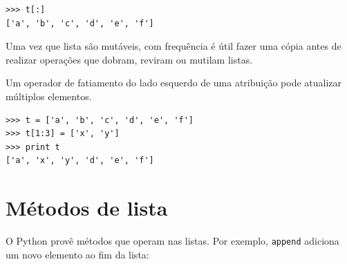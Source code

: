 
\beforeverb
\begin{verbatim}
>>> t[:]
['a', 'b', 'c', 'd', 'e', 'f']
\end{verbatim}
\afterverb
%

Uma vez que lista são mutáveis, com frequência é útil fazer uma cópia
antes de realizar operações que dobram, reviram ou mutilam listas.


Um operador de fatiamento do lado esquerdo de uma atribuição pode atualizar múltiplos elementos.


\beforeverb
\begin{verbatim}
>>> t = ['a', 'b', 'c', 'd', 'e', 'f']
>>> t[1:3] = ['x', 'y']
>>> print t
['a', 'x', 'y', 'd', 'e', 'f']
\end{verbatim}
\afterverb
%

\section{Métodos de lista}


O Python provê métodos que operam nas listas. Por exemplo,
{\tt append} adiciona um novo elemento ao fim da lista:

